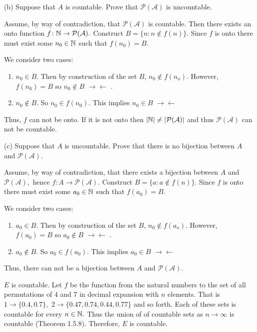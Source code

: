\documentclass{report}
\newcommand{\contra}{
$\rightarrow\!\leftarrow$
}
\begin{document}
\bigskip
(b) Suppose that $A$ is countable. Prove that $\mathcal{P}(\mathcal{A})$ is uncountable.
\bigskip
\par
\sol

Assume, by way of contradiction, that $\mathcal{P}(\mathcal{A})$ is countable. Then there exists an onto function $f\colon \NN \rightarrow \mathcal{P}(\mathcal{A}).$ Construct $B = \{n : n \not\in f(n)\}.$  Since $f$ is onto there must exist some $n_0 \in \NN$ such that $f(n_0) = B.$

We consider two cases:
\begin{enumerate}
  \item $n_0 \in B.$ Then by construction of the set $B$, $n_0 \not\in f(n_o).$ However, $f(n_0)=B$ so $n_0 \not\in B $ \contra.
  \item $n_0 \not\in B$. So $n_0 \in f(n_0).$ This implies $n_0 \in B$ \contra
\end{enumerate}

Thus, $f$ can not be onto. If it is not onto then $|\NN| \not= |\mathcal{P}(\mathcal{A})|$ and thus $\mathcal{P}(\mathcal{A})$ can not be countable.
\bigskip

(c) Suppose that $A$ is uncountable. Prove that there is no bijection between $A$ and $\mathcal{P}(\mathcal{A})$.
\bigskip
\begin{myproof}
    
Assume, by way of contradiction, that there exists a bijection between $A$ and $\mathcal{P}(\mathcal{A}),$ hence $f\colon A \rightarrow \mathcal{P}(\mathcal{A}).$ Construct $B = \{a : a \not\in f(n)\}.$  Since $f$ is onto there must exist some $a_0 \in \NN$ such that $f(a_0) = B.$

We consider two cases:
\begin{enumerate}
  \item $a_0 \in B.$ Then by construction of the set $B$, $n_0 \not\in f(a_o).$ However, $f(a_0)=B$ so $a_0 \not\in B $ \contra.
  \item $a_0 \not\in B$. So $a_0 \in f(a_0).$ This implies $a_0 \in B$ \contra
\end{enumerate}

Thus, there can not be a bijection  between  $A$ and $\mathcal{P}(\mathcal{A}).$ 

\end{myproof}

\sol 
\begin{myproof}
$E$ is countable. Let $f$ be the function from the natural numbers to the set of all permutations of $4$ and $7$ in decimal expansion with $n$ elements. That is $1 \rightarrow \{0.4, 0.7\},$  $2 \rightarrow \{0.47, 0.74, 0.44, 0.77\}$ and so forth. Each of these sets is countable for every $n \in \NN.$ Thus the union of of countable sets as $n \rightarrow \infty$ is countable (Theorem 1.5.8). Therefore, $E$ is countable.
    
\end{myproof}
\end{document}
